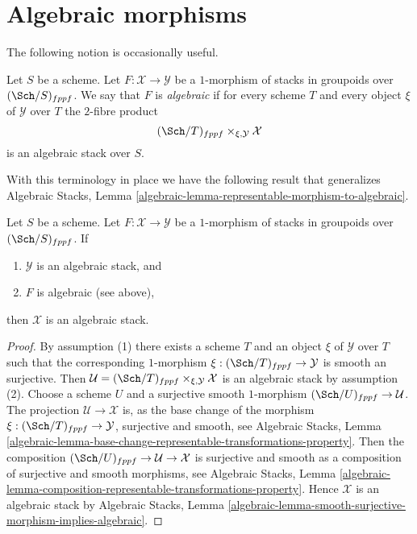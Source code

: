 \section{Algebraic morphisms}
\label{section-algebraic}

\noindent
The following notion is occasionally useful.

\begin{definition}
\label{definition-algebraic}
Let $S$ be a scheme. Let $F : \mathcal{X} \to \mathcal{Y}$ be a
$1$-morphism of stacks in groupoids over $(\Sch/S)_{fppf}$.
We say that $F$ is {\it algebraic} if for every scheme $T$ and every
object $\xi$ of $\mathcal{Y}$ over $T$ the $2$-fibre product
$$
(\Sch/T)_{fppf} \times_{\xi, \mathcal{Y}} \mathcal{X}
$$
is an algebraic stack over $S$.
\end{definition}

\noindent
With this terminology in place we have the following result that generalizes
Algebraic Stacks, Lemma
\ref{algebraic-lemma-representable-morphism-to-algebraic}.

\begin{lemma}
\label{lemma-algebraic-morphism-to-algebraic}
Let $S$ be a scheme.
Let $F : \mathcal{X} \to \mathcal{Y}$ be a $1$-morphism of
stacks in groupoids over $(\Sch/S)_{fppf}$. If
\begin{enumerate}
\item $\mathcal{Y}$ is an algebraic stack, and
\item $F$ is algebraic (see above),
\end{enumerate}
then $\mathcal{X}$ is an algebraic stack.
\end{lemma}

\begin{proof}
By assumption (1) there exists a scheme $T$ and an object
$\xi$ of $\mathcal{Y}$ over $T$ such that the corresponding
$1$-morphism $\xi : (\Sch/T)_{fppf} \to \mathcal{Y}$
is smooth an surjective. Then
$\mathcal{U} = (\Sch/T)_{fppf} \times_{\xi, \mathcal{Y}} \mathcal{X}$
is an algebraic stack by assumption (2).
Choose a scheme $U$ and a surjective smooth $1$-morphism
$(\Sch/U)_{fppf} \to \mathcal{U}$.
The projection $\mathcal{U} \longrightarrow \mathcal{X}$
is, as the base change of the morphism
$\xi : (\Sch/T)_{fppf} \to \mathcal{Y}$,
surjective and smooth, see
Algebraic Stacks, Lemma
\ref{algebraic-lemma-base-change-representable-transformations-property}.
Then the composition
$(\Sch/U)_{fppf} \to \mathcal{U} \to \mathcal{X}$
is surjective and smooth as a composition of surjective and smooth
morphisms, see
Algebraic Stacks, Lemma
\ref{algebraic-lemma-composition-representable-transformations-property}.
Hence $\mathcal{X}$ is an algebraic stack by
Algebraic Stacks, Lemma
\ref{algebraic-lemma-smooth-surjective-morphism-implies-algebraic}.
\end{proof}

